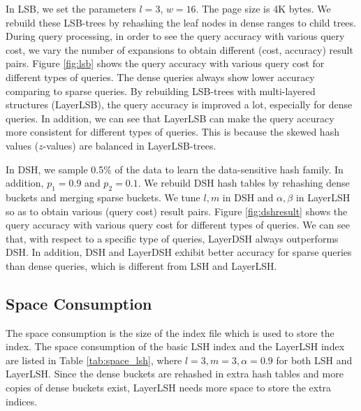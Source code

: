 
 In LSB, we set the parameters $l=3$, $w=16$. The page size is 4K bytes. We rebuild these LSB-trees by rehashing the leaf nodes in dense ranges to child trees. During query processing, in order to see the query accuracy with various query cost, we vary the number of expansions to obtain different (cost, accuracy) result pairs. Figure \ref{fig:lsb} shows the query accuracy with various query cost for different types of queries. The dense queries always show lower accuracy comparing to sparse queries. By rebuilding LSB-trees with multi-layered structures (LayerLSB), the query accuracy is improved a lot, especially for dense queries. In addition, we can see that LayerLSB can make the query accuracy more consistent for different types of queries. This is because the skewed hash values ($z$-values) are balanced in LayerLSB-trees.


 In DSH, we sample 0.5\% of the data to learn the data-sensitive hash family. In addition, $p_1=0.9$ and $p_2=0.1$. We rebuild DSH hash tables by rehashing dense buckets and merging sparse buckets. We tune $l,m$ in DSH and $\alpha,\beta$ in LayerLSH so as to obtain various (query cost) result pairs. Figure \ref{fig:dshresult} shows the query accuracy with various query cost for different types of queries. We can see that, with respect to a specific type of queries, LayerDSH always outperforms DSH. In addition, DSH and LayerDSH exhibit better accuracy for sparse queries than dense queries, which is different from LSH and LayerLSH.

\vspace{-0.1in}
\subsection{Space Consumption}

The space consumption is the size of the index file which is used to store the index. The space consumption of the basic LSH index and the LayerLSH index are listed in Table \ref{tab:space_lsh}, where $l=3, m=3, \alpha=0.9$ for both LSH and LayerLSH. Since the dense buckets are rehashed in extra hash tables and more copies of dense buckets exist, LayerLSH needs more space to store the extra indices.

